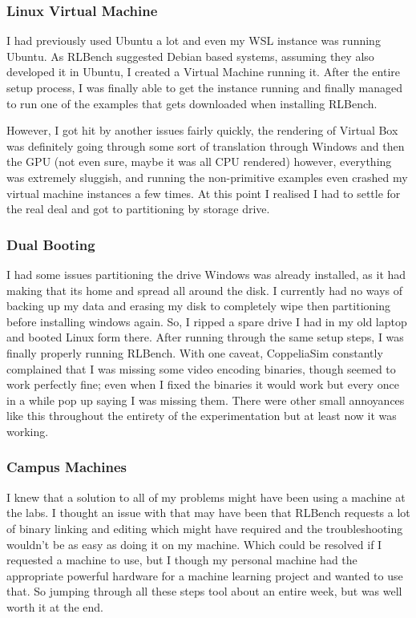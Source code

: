\subsubsection{Linux Virtual Machine}
I had previously used Ubuntu a lot and even my WSL instance was running Ubuntu. As RLBench suggested Debian based systems, assuming they also developed it in Ubuntu, I created a Virtual Machine running it. After the entire setup process, I was finally able to get the instance running and finally managed to run one of the examples that gets downloaded when installing RLBench.

However, I got hit by another issues fairly quickly, the rendering of Virtual Box was definitely going through some sort of translation through Windows and then the GPU (not even sure, maybe it was all CPU rendered) however, everything was extremely sluggish, and running the non-primitive examples even crashed my virtual machine instances a few times. At this point I realised I had to settle for the real deal and got to partitioning by storage drive.

\subsubsection{Dual Booting}
I had some issues partitioning the drive Windows was already installed, as it had making that its home and spread all around the disk. I currently had no ways of backing up my data and erasing my disk to completely wipe then partitioning before installing windows again. So, I ripped a spare drive I had in my old laptop and booted Linux form there. After running through the same setup steps, I was finally properly running RLBench. With one caveat, CoppeliaSim constantly complained that I was missing some video encoding binaries, though seemed to work perfectly fine; even when I fixed the binaries it would work but every once in a while pop up saying I was missing them. There were other small annoyances like this throughout the entirety of the experimentation but at least now it was working.

\subsubsection{Campus Machines}
I knew that a solution to all of my problems might have been using a machine at the labs. I thought an issue with that may have been that RLBench requests a lot of binary linking and editing which might have required and the troubleshooting wouldn't be as easy as doing it on my machine. Which could be resolved if I requested a machine to use, but I though my personal machine had the appropriate powerful hardware for a machine learning project and wanted to use that. So jumping through all these steps tool about an entire week, but was well worth it at the end.


